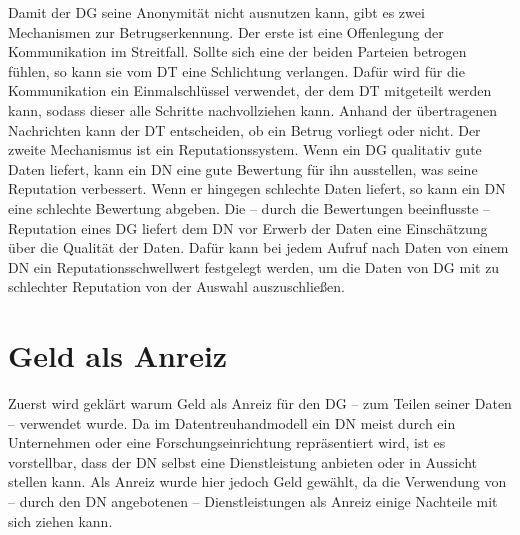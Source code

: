 \documentclass[
	fontsize=11pt,
	headings=small,
	parskip=half,           %
	bibliography=totoc,
	numbers=noenddot,       %
	open=any,               %
]{scrreprt}
\begin{document}
Damit der DG seine Anonymität nicht ausnutzen kann, gibt es zwei Mechanismen zur Betrugserkennung. Der erste ist eine Offenlegung der Kommunikation im Streitfall. Sollte sich eine der beiden Parteien betrogen fühlen, so kann sie vom DT eine Schlichtung verlangen. Dafür wird für die Kommunikation ein Einmalschlüssel verwendet, der dem DT mitgeteilt werden kann, sodass dieser alle Schritte nachvollziehen kann. Anhand der übertragenen Nachrichten kann der DT entscheiden, ob ein Betrug vorliegt oder nicht. 
Der zweite Mechanismus ist ein Reputationssystem. Wenn ein DG qualitativ gute Daten liefert, kann ein DN eine gute Bewertung für ihn ausstellen, was seine Reputation verbessert. Wenn er hingegen schlechte Daten liefert, so kann ein DN eine schlechte Bewertung abgeben. Die -- durch die Bewertungen beeinflusste -- Reputation eines DG liefert dem DN vor Erwerb der Daten eine Einschätzung über die Qualität der Daten. Dafür kann bei jedem Aufruf nach Daten von einem DN ein Reputationsschwellwert festgelegt werden, um die Daten von DG mit zu schlechter Reputation von der Auswahl auszuschließen.

\section{Geld als Anreiz}
\label{sec:incentiveExplaination}
Zuerst wird geklärt warum Geld als Anreiz für den DG -- zum Teilen seiner Daten -- verwendet wurde. Da im Datentreuhandmodell ein DN meist durch ein Unternehmen oder eine Forschungseinrichtung repräsentiert wird, ist es vorstellbar, dass der DN selbst eine Dienstleistung anbieten oder in Aussicht stellen kann. Als Anreiz wurde hier jedoch Geld gewählt, da die Verwendung von -- durch den DN angebotenen -- Dienstleistungen als Anreiz einige Nachteile mit sich ziehen kann.
\end{document}
